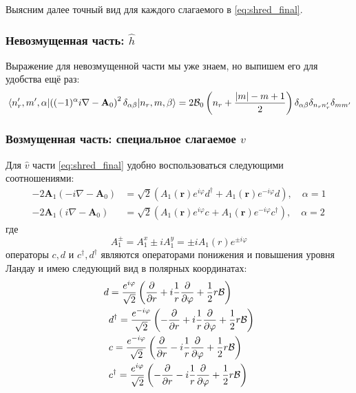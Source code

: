 \documentclass[a4paper,article,14pt]{extarticle}
\begin{document}
Выясним далее точный вид для каждого слагаемого в \eqref{eq:shred_final}. 

\subsubsection{Невозмущенная часть: $\hat h$}
Выражение для невозмущенной части мы уже знаем, но выпишем его для удобства ещё раз:
\begin{equation}
\mel{n'_r, m', \alpha} {\left((-1)^\alpha i \nabla - \mathbf{A}_0 \right) ^ 2 \delta_{\alpha \beta}} {n_r, m, \beta} = 
2 {\cal B}_{0} \left( n_r + \frac{|m| - m + 1}{2} \right) \delta_{\alpha \beta} \delta_{n_r n'_r} \delta_{m m'} 
\end{equation}


\subsubsection{Возмущенная часть: специальное слагаемое $\hat v$}
Для  $\hat v$ части \eqref{eq:shred_final} удобно воспользоваться следующими соотношениями:
\begin{equation}
\begin{aligned}
-2 \mathbf{A}_1  (-i \nabla - \mathbf{A}_0 )& = \sqrt{2} \left( A_{1} (\mathbf{r}) e^{ i \varphi  } d^{\dagger} +  A_{1} (\mathbf{r}) e^{-i \varphi  } d \right), \quad \alpha = 1 \\
-2 \mathbf{A}_1  (i \nabla - \mathbf{A}_0 ) & = \sqrt{2} \left( A_{1} (\mathbf{r}) e^{  i \varphi  } c^{} +  A_{1} (\mathbf{r}) e^{-i \varphi  } c^{\dagger} \right) , \quad \alpha = 2
\end{aligned}
\end{equation}
где 
$$
A^{\pm}_{1}   = A_{1}^{x} \pm i A_{1}^{y} = \pm i A_1 (r) e^{ \pm i \varphi  } 
$$
операторы $c,d$ и $c^{\dagger},d^{\dagger} $ являются операторами понижения и повышения уровня Ландау и имею следующий вид в полярных координатах:
\begin{equation}
\begin{aligned}
d &= \frac{e^{i \varphi}} {\sqrt{2}} \left(  \frac {\partial }{\partial r} + i \frac{1}{r}  \frac {\partial }{\partial \varphi} + \frac 1 2   r \cal B  \right) \\
&d^{\dagger} = \frac{e^{ -i \varphi}} {\sqrt{2}} \left(  - \frac {\partial }{\partial r} + i \frac{1}{r}  \frac {\partial }{\partial \varphi} + \frac 1 2    r \cal B \right) \\
&c = \frac{e^{- i \varphi}} {\sqrt{2}} \left(  \frac {\partial }{\partial r} - i \frac{1}{r}  \frac {\partial }{\partial \varphi} + \frac 1 2   r \cal B  \right) \\
&c^{\dagger} = \frac{e^{ i \varphi}} {\sqrt{2}} \left(  - \frac {\partial }{\partial r} - i \frac{1}{r}  \frac {\partial }{\partial \varphi} + \frac 1 2    r \cal B \right) \\
\end{aligned}
\end{equation}
\end{document}
